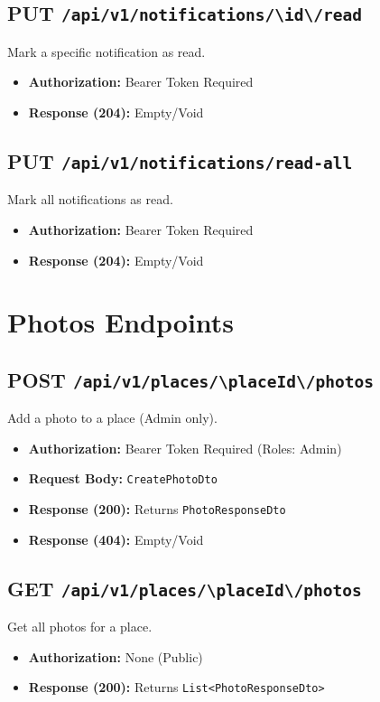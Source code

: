 \subsection{PUT \texttt{/api/v1/notifications/\textbackslash{}{id\textbackslash{}}/read}}
Mark a specific notification as read.
\begin{itemize}
    \item \textbf{Authorization:} Bearer Token Required
    \item \textbf{Response (204):} Empty/Void
\end{itemize}

\subsection{PUT \texttt{/api/v1/notifications/read-all}}
Mark all notifications as read.
\begin{itemize}
    \item \textbf{Authorization:} Bearer Token Required
    \item \textbf{Response (204):} Empty/Void
\end{itemize}

\section{Photos Endpoints}

\subsection{POST \texttt{/api/v1/places/\textbackslash{}{placeId\textbackslash{}}/photos}}
Add a photo to a place (Admin only).
\begin{itemize}
    \item \textbf{Authorization:} Bearer Token Required (Roles: Admin)
    \item \textbf{Request Body:} \texttt{CreatePhotoDto}
    \item \textbf{Response (200):} Returns \texttt{PhotoResponseDto}
    \item \textbf{Response (404):} Empty/Void
\end{itemize}

\subsection{GET \texttt{/api/v1/places/\textbackslash{}{placeId\textbackslash{}}/photos}}
Get all photos for a place.
\begin{itemize}
    \item \textbf{Authorization:} None (Public)
    \item \textbf{Response (200):} Returns \texttt{List<PhotoResponseDto>}
\end{itemize}

